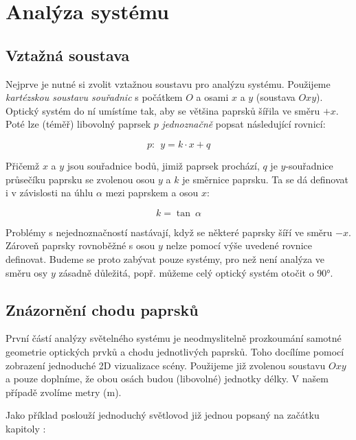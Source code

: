 \section{Analýza systému}
\label{sec:analyzasystemu}

\subsection{Vztažná soustava}

Nejprve je nutné si zvolit vztažnou soustavu pro analýzu systému. Použijeme \emph{kartézskou soustavu souřadnic} s počátkem $O$ a osami $x$ a $y$ (soustava $Oxy$). Optický systém do ní umístíme tak, aby se většina paprsků šířila ve směru $+x$. Poté lze (téměř) libovolný paprsek $p$ \emph{jednoznačně} popsat následující rovnicí:

\[ p:\ \ y = k \cdot x + q \]

Přičemž $x$ a $y$ jsou souřadnice bodů, jimiž paprsek prochází, $q$ je $y$-souřadnice průsečíku paprsku se zvolenou osou $y$ a $k$ je směrnice paprsku. Ta se dá definovat i v závislosti na úhlu $\alpha$ mezi paprskem a osou $x$:

\[ k = \tan\ \alpha \]

Problémy s nejednoznačností nastávají, když se některé paprsky šíří ve směru $-x$. Zároveň paprsky rovnoběžné s osou $y$ nelze pomocí výše uvedené rovnice definovat. Budeme se proto zabývat pouze systémy, pro než není analýza ve směru osy $y$ zásadně důležitá, popř. můžeme celý optický systém otočit o 90°.


\subsection{Znázornění chodu paprsků}
První částí analýzy světelného systému je neodmyslitelně prozkoumání samotné geometrie optických prvků a chodu jednotlivých paprsků. Toho docílíme pomocí zobrazení jednoduché 2D vizualizace scény. Použijeme již zvolenou soustavu $Oxy$ a pouze doplníme, že obou osách budou (libovolné) jednotky délky. V našem případě zvolíme metry ($\mathrm{m}$).

Jako příklad poslouží jednoduchý světlovod již jednou popsaný na začátku kapitoly :



